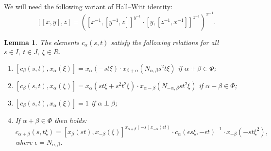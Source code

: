 \documentclass[oneside, 8pt]{amsart}
\newtheorem{lemma}{Lemma}
\theoremstyle{remark}
\theoremstyle{definition}
\numberwithin{lemma}{section}
\numberwithin{prop}{section}
\numberwithin{corollary}{section}
\numberwithin{equation}{section}
\begin{document}
We will need the following variant of Hall--Witt identity:
\begin{equation} \label{HW-variant} [[x, y], z] = \left([x^{-1}, [ y^{-1}, z]] ^ {y^{-1}} \cdot [y, [ z^{-1}, x^{-1}]] ^ {z^{-1}} \right)^{x^{-1}}.\end{equation}
\begin{lemma} \label{Crels}
The elements $c_\alpha(s, t)$ satisfy the following relations for all $s\in I,\ t\in J,\ \xi\in R$.
 \begin{enumerate}
 \item \label{C1} $[c_\beta(s, t), x_{\alpha}(\xi)] = x_{\alpha}(- st\xi) \cdot x_{\beta+\alpha}(N_{\alpha,\beta}s^2t\xi)$ if $\alpha+\beta \in \Phi$;
 \item \label{C2} $[c_\beta(s, t), x_{\alpha}(\xi)] = x_{\alpha}(st\xi + s^2t^2\xi) \cdot x_{\alpha-\beta}(N_{-\alpha, \beta}st^2\xi)$ if $\alpha-\beta \in \Phi$;  
 \item \label{C3} $[c_\beta(s, t), x_{\alpha}(\xi)] = 1$ if $\alpha \perp \beta$;  
 \item \label{C4} If $\alpha+\beta\in\Phi$ then holds:
  \[c_{\alpha+\beta}(s, t\xi) = [x_{\beta}(st), x_{-\beta}(\xi)] ^ {x_{\alpha+\beta}(-s) x_{-\alpha}(\epsilon t)} \cdot c_{\alpha}(\epsilon s\xi, -\epsilon t)^{-1} \cdot x_{-\beta}(-st\xi^2),\]
  where $\epsilon = N_{\alpha,\beta}$.
 \end{enumerate}
\end{lemma}
\end{document}
